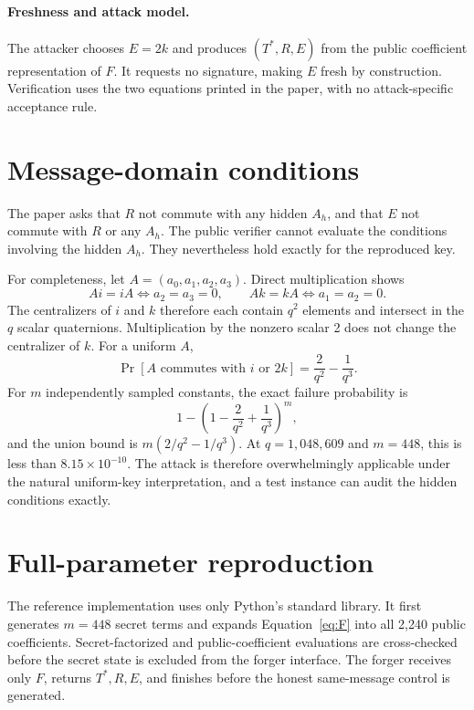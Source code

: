 \documentclass[10pt,a4paper]{article}
\begin{document}
\paragraph{Freshness and attack model.}
The attacker chooses $E=2k$ and produces $(T^*,R,E)$ from the public
coefficient representation of $F$.  It requests no signature, making $E$
fresh by construction.  Verification uses the two equations printed in the
paper, with no attack-specific acceptance rule.

\section{Message-domain conditions}

The paper asks that $R$ not commute with any hidden $A_h$, and that $E$ not
commute with $R$ or any $A_h$.  The public verifier cannot evaluate the
conditions involving the hidden $A_h$.  They nevertheless hold exactly for
the reproduced key.

For completeness, let $A=(a_0,a_1,a_2,a_3)$.  Direct multiplication shows
\[
 Ai=iA \iff a_2=a_3=0,
 \qquad
 Ak=kA \iff a_1=a_2=0.
\]
The centralizers of $i$ and $k$ therefore each contain $q^2$ elements and
intersect in the $q$ scalar quaternions.  Multiplication by the nonzero scalar
2 does not change the centralizer of $k$.  For a uniform $A$,
\[
 \Pr[A\text{ commutes with }i\text{ or }2k]
 =\frac{2}{q^2}-\frac{1}{q^3}.
\]
For $m$ independently sampled constants, the exact failure probability is
\[
 1-\left(1-\frac{2}{q^2}+\frac{1}{q^3}\right)^m,
\]
and the union bound is
$m(2/q^2-1/q^3)$.  At $q=1{,}048{,}609$ and $m=448$, this is less than
$8.15\times10^{-10}$.  The attack is therefore overwhelmingly applicable
under the natural uniform-key interpretation, and a test instance can audit
the hidden conditions exactly.

\section{Full-parameter reproduction}

The reference implementation uses only Python's standard library.  It first
generates $m=448$ secret terms and expands Equation~\eqref{eq:F} into all
2,240 public coefficients.  Secret-factorized and public-coefficient
evaluations are cross-checked before the secret state is excluded from the
forger interface.  The forger receives only $F$, returns $T^*,R,E$, and
finishes before the honest same-message control is generated.
\end{document}
